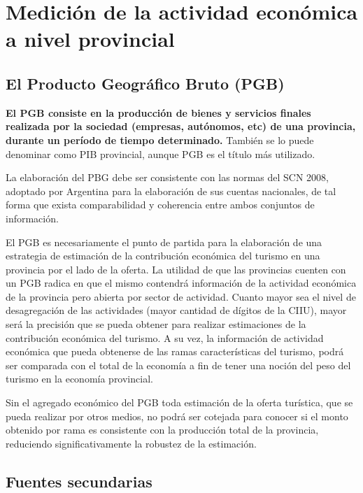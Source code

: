 \documentclass[
  openany]{book}
\begin{document}
\hypertarget{mediciuxf3n-de-la-actividad-econuxf3mica-a-nivel-provincial}{%
\section{Medición de la actividad económica a nivel provincial}\label{mediciuxf3n-de-la-actividad-econuxf3mica-a-nivel-provincial}}

\hypertarget{el-producto-geogruxe1fico-bruto-pgb}{%
\subsection{El Producto Geográfico Bruto (PGB)}\label{el-producto-geogruxe1fico-bruto-pgb}}

\textbf{El PGB consiste en la producción de bienes y servicios finales realizada por la sociedad (empresas, autónomos, etc) de una provincia, durante un período de tiempo determinado.} También se lo puede denominar como PIB provincial, aunque PGB es el título más utilizado.

La elaboración del PBG debe ser consistente con las normas del SCN 2008, adoptado por Argentina para la elaboración de sus cuentas nacionales, de tal forma que exista comparabilidad y coherencia entre ambos conjuntos de información.

El PGB es necesariamente el punto de partida para la elaboración de una estrategia de estimación de la contribución económica del turismo en una provincia por el lado de la oferta. La utilidad de que las provincias cuenten con un PGB radica en que el mismo contendrá información de la actividad económica de la provincia pero abierta por sector de actividad. Cuanto mayor sea el nivel de desagregación de las actividades (mayor cantidad de dígitos de la CIIU), mayor será la precisión que se pueda obtener para realizar estimaciones de la contribución económica del turismo. A su vez, la información de actividad económica que pueda obtenerse de las ramas características del turismo, podrá ser comparada con el total de la economía a fin de tener una noción del peso del turismo en la economía provincial.

Sin el agregado económico del PGB toda estimación de la oferta turística, que se pueda realizar por otros medios, no podrá ser cotejada para conocer si el monto obtenido por rama es consistente con la producción total de la provincia, reduciendo significativamente la robustez de la estimación.

\hypertarget{fuentes-secundarias}{%
\subsection{Fuentes secundarias}\label{fuentes-secundarias}}
\end{document}
